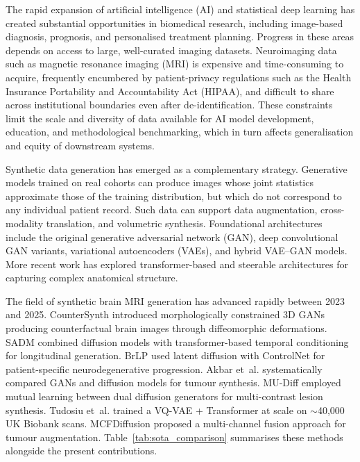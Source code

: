 \documentclass[11pt]{article}
\begin{document}
The rapid expansion of artificial intelligence (AI) and statistical deep learning has created substantial opportunities in biomedical research, including image-based diagnosis, prognosis, and personalised treatment planning\cite{castiglioni2021ai,dinov2023datascience,dinov2024neuroinformatics,huang2020artificial,Tang2019}. Progress in these areas depends on access to large, well-curated imaging datasets. Neuroimaging data such as magnetic resonance imaging (MRI) is expensive and time-consuming to acquire, frequently encumbered by patient-privacy regulations such as the Health Insurance Portability and Accountability Act (HIPAA), and difficult to share across institutional boundaries even after de-identification\cite{white2022data,wang2019leveraging,raab2023federated}. These constraints limit the scale and diversity of data available for AI model development, education, and methodological benchmarking, which in turn affects generalisation and equity of downstream systems\cite{stahl2023ethics,niraula2023clinical,dinovdata}.

Synthetic data generation has emerged as a complementary strategy. Generative models trained on real cohorts can produce images whose joint statistics approximate those of the training distribution, but which do not correspond to any individual patient record\cite{jordon2022synthetic,deldjoo2024review}. Such data can support data augmentation\cite{frid2018gan,bowles2018gan,shin2018medical}, cross-modality translation\cite{nie2017medical,zhu2017unpaired,wolterink2017deep,armanious2020medgan}, and volumetric synthesis\cite{chartsias2019disentangled,dalca2019learning}. Foundational architectures include the original generative adversarial network (GAN)\cite{goodfellow2014generative}, deep convolutional GAN variants\cite{radford2015unsupervised}, variational autoencoders (VAEs)\cite{kingma2013auto}, and hybrid VAE--GAN models\cite{larsen2016autoencoding}. More recent work has explored transformer-based and steerable architectures for capturing complex anatomical structure\cite{xiang2021bio}.

The field of synthetic brain MRI generation has advanced rapidly between 2023 and 2025. CounterSynth\cite{pombo2023equitable} introduced morphologically constrained 3D GANs producing counterfactual brain images through diffeomorphic deformations. SADM\cite{yoon2023sadm} combined diffusion models with transformer-based temporal conditioning for longitudinal generation. BrLP\cite{puglisi2024brlp} used latent diffusion with ControlNet for patient-specific neurodegenerative progression. Akbar et~al.\cite{akbar2024brain} systematically compared GANs and diffusion models for tumour synthesis. MU-Diff\cite{dayarathna2025mudiff} employed mutual learning between dual diffusion generators for multi-contrast lesion synthesis. Tudosiu et~al.\cite{tudosiu2024realistic} trained a VQ-VAE + Transformer at scale on $\sim$40{,}000 UK Biobank scans. MCFDiffusion\cite{zuo2025multichannel} proposed a multi-channel fusion approach for tumour augmentation. Table~\ref{tab:sota_comparison} summarises these methods alongside the present contributions.
\end{document}
